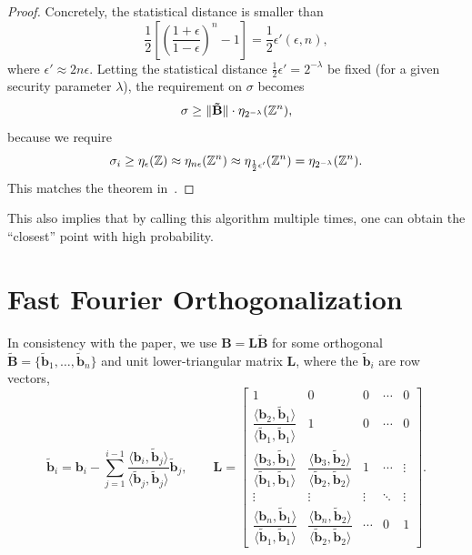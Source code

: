 \begin{proof}
	Concretely, the statistical distance is smaller than
	\[
		\frac{1}{2} \left[ \left(\frac{1+\epsilon}{1-\epsilon}\right)^n - 1 \right] = \frac{1}{2} \epsilon'(\epsilon, n),
	\]
	where $\epsilon' \approx 2n\epsilon$. Letting the statistical distance $\frac{1}{2}\epsilon' = 2^{-\lambda}$ be fixed (for a given security parameter $\lambda$), the requirement on $\sigma$ becomes
	\[
		\sigma \geq \|\mathbf{\tilde B}\| \cdot \eta_{2^{-\lambda}}(\mathbb{Z}^n),
	\]
	because we require
	\[
		\sigma_i \geq \eta_\epsilon(\mathbb{Z}) \approx \eta_{n\epsilon}(\mathbb{Z}^n) \approx \eta_{\frac{1}{2}\epsilon'}(\mathbb{Z}^n) = \eta_{2^{-\lambda}}(\mathbb{Z}^n).
	\]
	This matches the theorem in~\cite{Pre17}.

\end{proof}

\begin{remark}
	This also implies that by calling this algorithm multiple times, one can obtain the ``closest'' point with high probability.
\end{remark}


\section{Fast Fourier Orthogonalization~\cite{DP16}}

In consistency with the paper, we use $\mathbf{B} = \mathbf{L\tilde B}$ for some orthogonal $\mathbf{\tilde B} = \{\mathbf{\tilde b}_1, \dots, \mathbf{\tilde b}_n\}$ and unit lower-triangular matrix $\mathbf{L}$, where the $\mathbf{\tilde b}_i$ are row vectors,
\[
	\mathbf{\tilde b}_i = \mathbf{b}_i - \sum_{j=1}^{i-1} \frac{\langle \mathbf{b}_i, \mathbf{\tilde b}_j \rangle}{\langle \mathbf{\tilde b}_j, \mathbf{\tilde b}_j \rangle} \mathbf{\tilde b}_j, \qquad
	\mathbf{L} =
	\begin{bmatrix}
		1 & 0 & 0 & \cdots & 0 \\
		\dfrac{\langle \mathbf{b}_2, \mathbf{\tilde b}_1 \rangle}{\langle \mathbf{\tilde b}_1, \mathbf{\tilde b}_1 \rangle} & 1 & 0 & \cdots & 0 \\
		\dfrac{\langle \mathbf{b}_3, \mathbf{\tilde b}_1 \rangle}{\langle \mathbf{\tilde b}_1, \mathbf{\tilde b}_1 \rangle} & \dfrac{\langle \mathbf{b}_3, \mathbf{\tilde b}_2 \rangle}{\langle \mathbf{\tilde b}_2, \mathbf{\tilde b}_2 \rangle} & 1 & \cdots & \vdots \\
		\vdots & \vdots & \vdots & \ddots & \vdots \\
		\dfrac{\langle \mathbf{b}_n, \mathbf{\tilde b}_1 \rangle}{\langle \mathbf{\tilde b}_1, \mathbf{\tilde b}_1 \rangle} & \dfrac{\langle \mathbf{b}_n, \mathbf{\tilde b}_2 \rangle}{\langle \mathbf{\tilde b}_2, \mathbf{\tilde b}_2 \rangle} & \cdots & 0 & 1
	\end{bmatrix}.
\]

